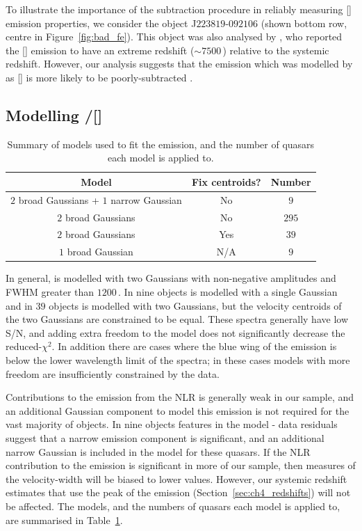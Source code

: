 To illustrate the importance of the  subtraction procedure in reliably measuring [] emission properties, we consider the object J$223819$-$092106$ (shown bottom row, centre in Figure~\ref{fig:bad_fe}). 
This object was also analysed by \citet{shen16a}, who reported the [] emission to have an extreme redshift ($\sim7500$\,\kms) relative to the \citet{hewett10} systemic redshift.
However, our analysis suggests that the emission which was modelled by \citet{shen16a} as [] is more likely to be poorly-subtracted .  

\subsection{Modelling \hbns/[]}
\label{sec:oiiimodel}

\begin{table}
  \centering
  \footnotesize 
    \begin{tabular}{ccc} 
    \hline
    Model & Fix centroids? & Number \\
    \hline
    $2$ broad Gaussians + $1$ narrow Gaussian & No & $9$ \\
    $2$ broad Gaussians & No  &  $295$ \\
    $2$ broad Gaussians & Yes &  $39$ \\
    $1$ broad Gaussian  & N/A &  $9$ \\
    \hline
    \end{tabular}
    \caption[{Summary of models used to fit the \hb emission, and the number of quasars each model is applied to.}]{Summary of models used to fit the \hb emission, and the number of quasars each model is applied to.}
  \label{tab:hbmod}
\end{table} 

In general, \hb is modelled with two Gaussians with non-negative amplitudes and FWHM greater than $1200$\,\kms.
In nine objects \hb is modelled with a single Gaussian and in $39$ objects \hb is modelled with two Gaussians, but the velocity centroids of the two Gaussians are constrained to be equal. 
These spectra generally have low S/N, and adding extra freedom to the model does not significantly decrease the  reduced-$\chi^2$.
In addition there are cases where the blue wing of the \hb emission is below the lower wavelength limit of the spectra; in these cases models with more freedom are insufficiently constrained by the data.    

Contributions to the \hb emission from the NLR is generally weak in our sample, and an additional Gaussian component to model this emission is not required for the vast majority of objects. 
In nine objects features in the model - data residuals suggest that a narrow emission component is significant, and an additional narrow Gaussian is included in the model for these quasars. 
If the NLR contribution to the \hb emission is significant in more of our sample, then measures of the \hb velocity-width will be biased to lower values. 
However, our systemic redshift estimates that use the peak of the \hb emission (Section~\ref{sec:ch4_redshifts}) will not be affected. 
The \hb models, and the numbers of quasars each model is applied to, are summarised in Table~\ref{tab:hbmod}. 

